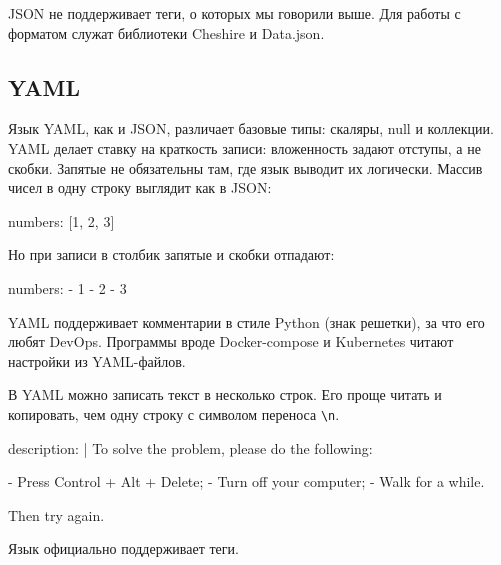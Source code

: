 
JSON не поддерживает теги, о которых мы говорили выше. Для работы с форматом
служат библиотеки Cheshire и
Data.json.

\subsection{YAML}


Язык YAML, как и JSON, различает базовые типы: скаляры, null и коллекции. YAML
делает ставку на краткость записи: вложенность задают отступы, а не
скобки. Запятые не обязательны там, где язык выводит их логически. Массив чисел
в одну строку выглядит как в JSON:


\begin{english}
  \begin{yaml}
numbers: [1, 2, 3]
  \end{yaml}
\end{english}

\noindent
Но при записи в столбик запятые и скобки отпадают:

\begin{english}
  \begin{yaml}
numbers:
  - 1
  - 2
  - 3
  \end{yaml}
\end{english}

YAML поддерживает комментарии в стиле Python (знак решетки), за что его любят
DevOps. Программы вроде Docker-compose и Kubernetes читают настройки из
YAML-файлов.

В YAML можно записать текст в несколько строк. Его проще читать и копировать,
чем одну строку с символом переноса \verb|\n|.

\begin{english}
  \begin{yaml}
description: |
  To solve the problem, please do the following:

  - Press Control + Alt + Delete;
  - Turn off your computer;
  - Walk for a while.

  Then try again.
  \end{yaml}
\end{english}

Язык официально поддерживает теги.


